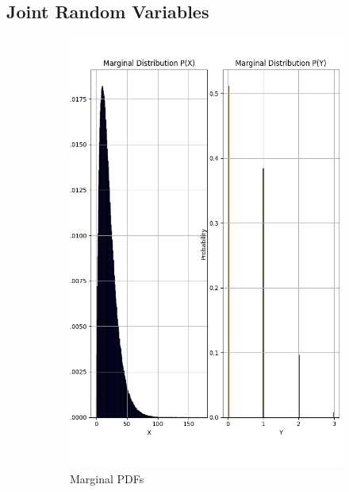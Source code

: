 \documentclass{article}
\begin{document}
\subsection{Joint Random Variables}

\begin{figure}[H]
  \centering
  \begin{subfigure}{0.45\textwidth}
    \centering
    \includegraphics[width=\linewidth]{results/section2/a(1).png}
    \caption{Marginal PDFs}
  \end{subfigure}
  \hfill
  \begin{subfigure}{0.45\textwidth}
    \centering

\end{subfigure}
\end{figure}
\end{document}
